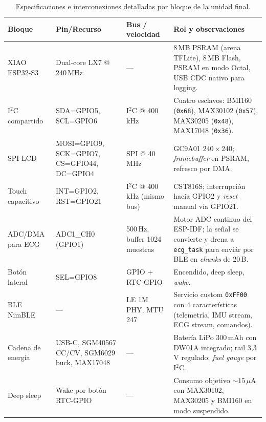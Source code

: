 \documentclass[letterpaper,11pt]{article}
\begin{document}
\begin{table}[H]
    \centering
    \caption{Especificaciones e interconexiones detalladas por bloque de la unidad final.}
    \label{tab:specs_final}
    \footnotesize
    \renewcommand{\arraystretch}{1.05}
    \begin{tabular}{|L{2.6cm}|L{2.9cm}|L{3.3cm}|L{6.4cm}|}\hline
    \textbf{Bloque} & \textbf{Pin/Recurso} & \textbf{Bus / velocidad} & \textbf{Rol y observaciones} \\\hline
    XIAO ESP32-S3 & Dual-core LX7 @ 240\,MHz & --- & 8\,MB PSRAM (arena TFLite), 8\,MB Flash, PSRAM en modo Octal, USB CDC nativo para logging. \cite{esp32s3_ds_2024,xiao_esp32s3_pinout} \\\hline
    I$^2$C compartido & SDA=GPIO5, SCL=GPIO6 & I$^2$C @ 400\,kHz & Cuatro esclavos: BMI160 (\texttt{0x68}), MAX30102 (\texttt{0x57}), MAX30205 (\texttt{0x48}), MAX17048 (\texttt{0x36}). \\\hline
    SPI LCD & MOSI=GPIO9, SCK=GPIO7, CS=GPIO44, DC=GPIO4 & SPI @ 40\,MHz & GC9A01 $240\times240$; \textit{framebuffer} en PSRAM, refresco por DMA. \cite{gc9a01_ds,lvgl_ref} \\\hline
    Touch capacitivo & INT=GPIO2, RST=GPIO21 & I$^2$C @ 400\,kHz (mismo bus) & CST816S; interrupci\'on hacia GPIO2 y \textit{reset} manual v\'ia GPIO21. \cite{cst816s_ds} \\\hline
    ADC/DMA para ECG & ADC1\_CH0 (GPIO1) & 500\,Hz, buffer 1024 muestras & Motor ADC continuo del ESP-IDF; la se\~nal se convierte y drena a \texttt{ecg\_task} para envi\'ar por BLE en \textit{chunks} de 20\,B. \cite{ad8232_ds} \\\hline
    Bot\'on lateral & SEL=GPIO8 & GPIO + RTC-GPIO & Encendido, deep sleep, \textit{wake}. \\\hline
    BLE NimBLE & --- & LE 1M PHY, MTU 247 & Servicio custom \texttt{0xFF00} con 4 caracter\'isticas (telemetr\'ia, IMU stream, ECG stream, comandos). \cite{ble_core_spec,nimble_ref} \\\hline
    Cadena de energ\'ia & USB-C, SGM40567 CC/CV, SGM6029 buck, MAX17048 & --- & Bater\'ia LiPo $300$\,mAh con DW01A integrado; rail 3{,}3\,V regulado; \textit{fuel gauge} por I$^2$C. \cite{sgm40567_ds,sgm6029_ds,dw01a_ds,max17048_ds} \\\hline
    Deep sleep & Wake por bot\'on RTC-GPIO & --- & Consumo objetivo $\sim 15\,\mu$A con MAX30102, MAX30205 y BMI160 en modo suspendido. \cite{espidf_sleep} \\\hline
    \end{tabular}
\end{table}
\end{document}
